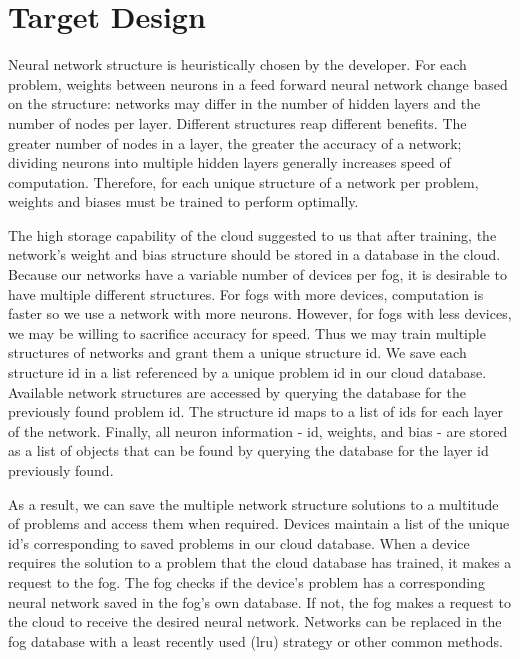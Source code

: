 \documentclass{article}
\begin{document}
\section{Target Design}

\begin{multicols}{2}
	Neural network structure is heuristically chosen by the developer. For each problem, weights between neurons in a feed forward neural network change based on the structure: networks may differ in the number of hidden layers and the number of nodes per layer. Different structures reap different benefits. The greater number of nodes in a layer, the greater the accuracy of a network; dividing neurons into multiple hidden layers generally increases speed of computation. Therefore, for each unique structure of a network per problem, weights and biases must be trained to perform optimally. 
\par
	The high storage capability of the cloud suggested to us that after training, the network’s weight and bias structure should be stored in a database in the cloud. Because our networks have a variable number of devices per fog, it is desirable to have multiple different structures. For fogs with more devices, computation is faster so we use a network with more neurons. However, for fogs with less devices, we may be willing to sacrifice accuracy for speed. Thus we may train multiple structures of networks and grant them a unique structure id. We save each structure id in a list referenced by a unique problem id in our cloud database. Available network structures are accessed by querying the database for the previously found problem id. The structure id maps to a list of ids for each layer of the network. Finally, all neuron information - id, weights, and bias - are stored as a list of objects that can be found by querying the database for the layer id previously found. 
\par 
As a result, we can save the multiple network structure solutions to a multitude of problems and access them when required. Devices maintain a list of the unique id’s corresponding to saved problems in our cloud database. When a device requires the solution to a problem that the cloud database has trained, it makes a request to the fog. The fog checks if the device’s problem has a corresponding neural network saved in the fog’s own database. If not, the fog makes a request to the cloud to receive the desired neural network. Networks can be replaced in the fog database with a least recently used (lru) strategy or other common methods. 
\par

\end{multicols}
\end{document}
